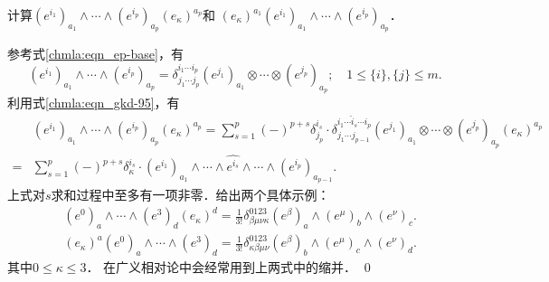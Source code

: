 \begin{example}\label{chdf:exam_eiapk}
	计算$(e^{i_1})_{a_1} \wedge \cdots \wedge (e^{i_p})_{a_p} (e_\kappa)^{a_p}$和
	$(e_\kappa)^{a_1} (e^{i_1})_{a_1} \wedge \cdots \wedge (e^{i_p})_{a_p} $．
\end{example}
参考式\eqref{chmla:eqn_ep-base}，有
\begin{equation*} %
	(e^{i_1})_{a_1} \wedge \cdots \wedge (e^{i_p})_{a_p}
	= \delta^{i_1 \cdots i_p}_{j_1 \cdots j_p}
	(e^{j_1})_{a_1}  \otimes	\cdots \otimes (e^{j_p})_{a_p} ;
	\quad 1\leqslant \{i\},  \{j\}  \leqslant m .
\end{equation*}
利用式\eqref{chmla:eqn_gkd-95}，有
\begin{align*}
	&(e^{i_1})_{a_1} \wedge \cdots \wedge (e^{i_p})_{a_p} (e_\kappa)^{a_p} = 
	\sum_{s=1}^{p} (-)^{p+s} \delta_{j_p}^{i_s} \cdot
	\delta_{j_1 \cdots  j_{p-1}}^{i_1 \cdots\hat{i}_s \cdots i_{p}}
	(e^{j_1})_{a_1}  \otimes	\cdots \otimes (e^{j_p})_{a_p} (e_\kappa)^{a_p} \\
	=& \sum_{s=1}^{p} (-)^{p+s} \delta_{\kappa}^{i_s} \cdot
	(e^{i_1})_{a_1} \wedge\cdots \wedge \widehat{e^{i_s}}
	\wedge \cdots \wedge (e^{i_p})_{a_{p-1}} .
\end{align*}
上式对$s$求和过程中至多有一项非零．给出两个具体示例：
\begin{align}
	&(e^{0})_{a} \wedge \cdots \wedge (e^{3})_{d} (e_\kappa)^{d}
	= \frac{1}{3!} \delta^{0123}_{\beta\mu\nu\kappa} 
	(e^\beta)_{a} \wedge (e^\mu)_{b} \wedge (e^\nu)_{c} . \\
	& (e_\kappa)^{a} (e^{0})_{a} \wedge \cdots \wedge (e^{3})_{d}
	=\frac{1}{3!} \delta^{0123}_{\kappa\beta\mu\nu} 
	(e^\beta)_{b} \wedge (e^\mu)_{c} \wedge (e^\nu)_{d} . 
\end{align}
其中$0\leqslant \kappa \leqslant 3$．
在广义相对论中会经常用到上两式中的缩并．
\qed



